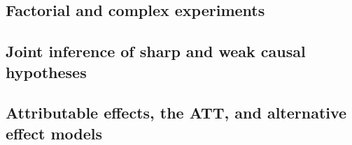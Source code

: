 \documentclass[12pt]{article}
\begin{document}
\begin{verse}  \end{verse}

\subsection{Factorial and complex experiments}

\begin{verse}  \end{verse}

\begin{verse}  \end{verse}

\begin{verse}  \end{verse}

\begin{verse}  \end{verse}

\begin{verse}  \end{verse}

\begin{verse}  \end{verse}

\begin{verse}  \end{verse}

\subsection{Joint inference of sharp and weak causal hypotheses}

\begin{verse}  \end{verse}

\begin{verse}  \end{verse}

\begin{verse}  \end{verse}

\begin{verse}  \end{verse}

\subsection{Attributable effects, the ATT, and alternative effect models}
\end{document}
